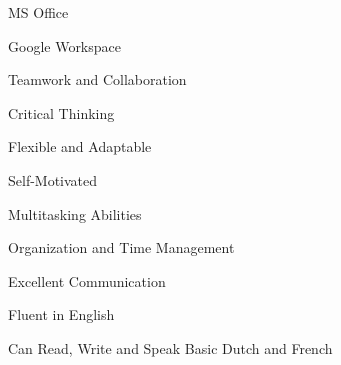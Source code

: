 



\begin{cvparagraph}



\begin{cventries}
  \cventry
{} %
{} %
{} %
{} %
{ %
\begin{cvitems*}
	\item{MS Office}
	\item{Google Workspace}
	\item{Teamwork and Collaboration}
	\item{Critical Thinking}
	\item{Flexible and Adaptable}
	\item{Self-Motivated}
	\item{Multitasking Abilities}
	\item{Organization and Time Management}
	\item{Excellent Communication}
	\item{Fluent in English}
	\item{Can Read, Write and Speak Basic Dutch and French}
\end{cvitems*}
}
\end{cventries}



\end{cvparagraph}
